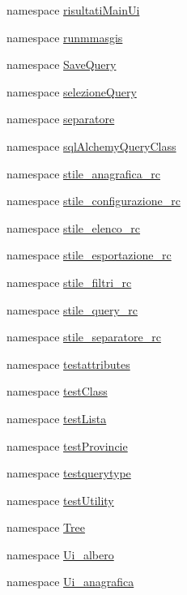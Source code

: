 \begin{DoxyCompactItemize}
namespace \hyperlink{namespacemmasgis_1_1risultatiMainUi}{risultatiMainUi}
\item 
namespace \hyperlink{namespacemmasgis_1_1runmmasgis}{runmmasgis}
\item 
namespace \hyperlink{namespacemmasgis_1_1SaveQuery}{SaveQuery}
\item 
namespace \hyperlink{namespacemmasgis_1_1selezioneQuery}{selezioneQuery}
\item 
namespace \hyperlink{namespacemmasgis_1_1separatore}{separatore}
\item 
namespace \hyperlink{namespacemmasgis_1_1sqlAlchemyQueryClass}{sqlAlchemyQueryClass}
\item 
namespace \hyperlink{namespacemmasgis_1_1stile__anagrafica__rc}{stile\_\-anagrafica\_\-rc}
\item 
namespace \hyperlink{namespacemmasgis_1_1stile__configurazione__rc}{stile\_\-configurazione\_\-rc}
\item 
namespace \hyperlink{namespacemmasgis_1_1stile__elenco__rc}{stile\_\-elenco\_\-rc}
\item 
namespace \hyperlink{namespacemmasgis_1_1stile__esportazione__rc}{stile\_\-esportazione\_\-rc}
\item 
namespace \hyperlink{namespacemmasgis_1_1stile__filtri__rc}{stile\_\-filtri\_\-rc}
\item 
namespace \hyperlink{namespacemmasgis_1_1stile__query__rc}{stile\_\-query\_\-rc}
\item 
namespace \hyperlink{namespacemmasgis_1_1stile__separatore__rc}{stile\_\-separatore\_\-rc}
\item 
namespace \hyperlink{namespacemmasgis_1_1testattributes}{testattributes}
\item 
namespace \hyperlink{namespacemmasgis_1_1testClass}{testClass}
\item 
namespace \hyperlink{namespacemmasgis_1_1testLista}{testLista}
\item 
namespace \hyperlink{namespacemmasgis_1_1testProvincie}{testProvincie}
\item 
namespace \hyperlink{namespacemmasgis_1_1testquerytype}{testquerytype}
\item 
namespace \hyperlink{namespacemmasgis_1_1testUtility}{testUtility}
\item 
namespace \hyperlink{namespacemmasgis_1_1Tree}{Tree}
\item 
namespace \hyperlink{namespacemmasgis_1_1Ui__albero}{Ui\_\-albero}
\item 
namespace \hyperlink{namespacemmasgis_1_1Ui__anagrafica}{Ui\_\-anagrafica}

\end{DoxyCompactItemize}

